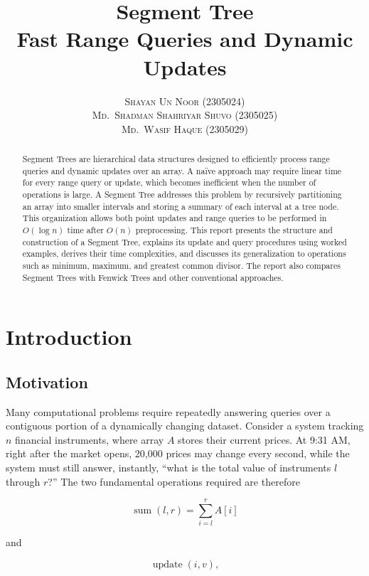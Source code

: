 \documentclass[11pt]{scrartcl}
\title{\textbf{\Large Segment Tree}\\[4pt]\large Fast Range Queries and Dynamic Updates}
\author{\textsc{Shayan Un Noor} (2305024) \\ \textsc{Md.\ Shadman Shahriyar Shuvo} (2305025) \\ \textsc{Md.\ Wasif Haque} (2305029)}
\date{}
\begin{document}
\maketitle
\tableofcontents


\newpage

\begin{abstract}
\noindent Segment Trees are hierarchical data structures designed to efficiently process range queries and dynamic updates over an array. A na\"ive approach may require linear time for every range query or update, which becomes inefficient when the number of operations is large. A Segment Tree addresses this problem by recursively partitioning an array into smaller intervals and storing a summary of each interval at a tree node. This organization allows both point updates and range queries to be performed in $O(\log n)$ time after $O(n)$ preprocessing. This report presents the structure and construction of a Segment Tree, explains its update and query procedures using worked examples, derives their time complexities, and discusses its generalization to operations such as minimum, maximum, and greatest common divisor. The report also compares Segment Trees with Fenwick Trees and other conventional approaches.
\end{abstract}

\section{Introduction}

\subsection{Motivation}
Many computational problems require repeatedly answering queries over a contiguous portion of a dynamically changing dataset. Consider a system tracking $n$ financial instruments, where array $A$ stores their current prices. At 9:31 AM, right after the market opens, 20{,}000 prices may change every second, while the system must still answer, instantly, ``what is the total value of instruments $l$ through $r$?'' The two fundamental operations required are therefore

\begin{equation}
\operatorname{sum}(l,r) = \sum_{i=l}^{r} A[i]
\label{eq:sum}
\end{equation}

and

\begin{equation}
\operatorname{update}(i,v),
\label{eq:update}
\end{equation}
\end{document}
